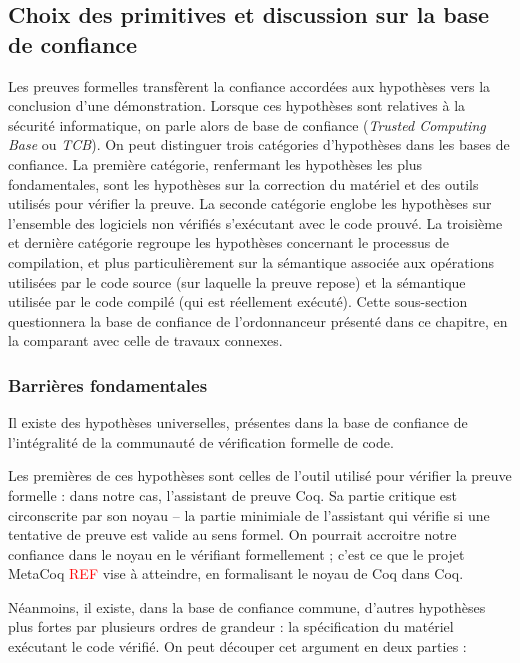 		\subsection{Choix des primitives et discussion sur la base de confiance}
		\label{sec:interfaceTCB}

		Les preuves formelles transfèrent la confiance accordées aux hypothèses vers la conclusion d'une démonstration. Lorsque ces hypothèses sont relatives à la sécurité informatique, on parle alors de base de confiance (\emph{Trusted Computing Base} ou \emph{TCB}). On peut distinguer trois catégories d'hypothèses dans les bases de confiance. La première catégorie, renfermant les hypothèses les plus fondamentales, sont les hypothèses sur la correction du matériel et des outils utilisés pour vérifier la preuve. La seconde catégorie englobe les hypothèses sur l'ensemble des logiciels non vérifiés s'exécutant avec le code prouvé. La troisième et dernière catégorie regroupe les hypothèses concernant le processus de compilation, et plus particulièrement sur la sémantique associée aux opérations utilisées par le code source (sur laquelle la preuve repose) et la sémantique utilisée par le code compilé (qui est réellement exécuté). Cette sous-section questionnera la base de confiance de l'ordonnanceur présenté dans ce chapitre, en la comparant avec celle de travaux connexes.

\subsubsection{Barrières fondamentales}

Il existe des hypothèses universelles, présentes dans la base de confiance de l'intégralité de la communauté de vérification formelle de code.

Les premières de ces hypothèses sont celles de l'outil utilisé pour vérifier la preuve formelle : dans notre cas, l'assistant de preuve Coq. Sa partie critique est circonscrite par son noyau -- la partie minimiale de l'assistant qui vérifie si une tentative de preuve est valide au sens formel. On pourrait accroitre notre confiance dans le noyau en le vérifiant formellement ; c'est ce que le projet MetaCoq \textcolor{red}{REF} vise à atteindre, en formalisant le noyau de Coq dans Coq.

Néanmoins, il existe, dans la base de confiance commune, d'autres hypothèses plus fortes par plusieurs ordres de grandeur : la spécification du matériel exécutant le code vérifié. On peut découper cet argument en deux parties :

